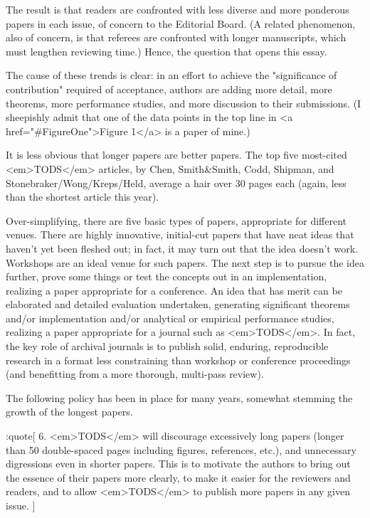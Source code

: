 The result is that readers are confronted with less diverse and more
ponderous papers in each issue, of concern to the Editorial Board. (A
related phenomenon, also of concern, is that referees are confronted with
longer manuscripts, which must lengthen reviewing time.) Hence, the question
that opens this essay.

The cause of these trends is clear: in an effort to achieve
the "significance of contribution" required of acceptance, authors
are adding more detail, more theorems, more performance studies, and more
discussion to their submissions. (I
sheepishly admit that one of the data points in the top line in
<a href="#FigureOne">Figure 1</a>
is a paper of mine.)

It is less obvious that longer papers are better papers.
The top five most-cited <em>TODS</em> articles, by Chen, Smith&Smith,
Codd, Shipman, and Stonebraker/Wong/Kreps/Held, average a hair over 30 pages
each (again, less than the shortest article this year).

Over-simplifying, there are five basic types of papers,
appropriate for different venues. There are highly innovative, initial-cut
papers that have neat ideas that haven't yet been fleshed out; in fact, it
may turn out that the idea doesn't work. Workshops are an ideal venue for
such papers. The next step is to pursue the idea further, prove some things
or test the concepts out in an implementation, realizing a paper appropriate
for a conference.  An idea that has merit can be elaborated and detailed
evaluation undertaken, generating significant theorems and/or implementation
and/or analytical or empirical performance studies, realizing a paper
appropriate for a journal such as <em>TODS</em>. In fact, the key role of
archival journals is to publish solid, enduring, reproducible research in a
format less constraining than workshop or conference proceedings (and
benefitting from a more thorough, multi-pass review).

The following policy has been in place for many years, somewhat stemming
the growth of the longest papers.

:quote[
6. <em>TODS</em> will discourage excessively long papers (longer than 50
double-spaced pages including figures, references, etc.), and unnecessary
digressions even in shorter papers. This is to motivate the authors to bring
out the essence of their papers more clearly, to make it easier for the
reviewers and readers, and to allow <em>TODS</em> to publish more papers in
any given issue.
]

